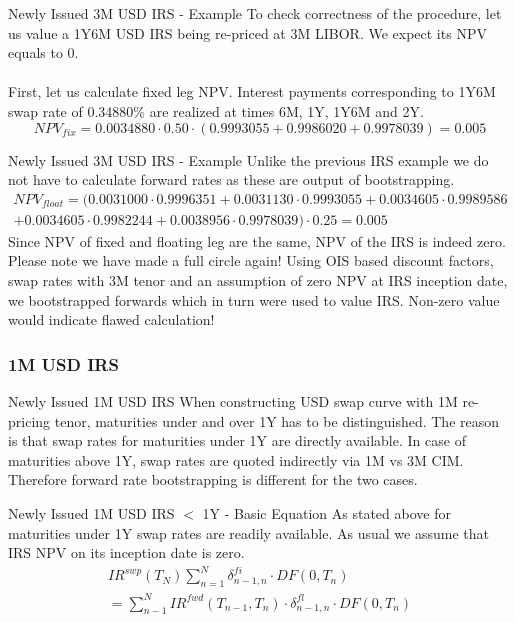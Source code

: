\documentclass{beamer}
\begin{document}
\begin{frame}{Newly Issued 3M USD IRS - Example}
To check correctness of the procedure, let us value a 1Y6M USD IRS being re-priced at 3M LIBOR. We expect its NPV equals to 0.
\\~\\
First, let us calculate fixed leg NPV. Interest payments corresponding to 1Y6M swap rate of 0.34880\% are realized at times 6M, 1Y, 1Y6M and 2Y.
\begin{equation*}
NPV_{fix} = 0.0034880 \cdot 0.50 \cdot (0.9993055 + 0.9986020 + 0.9978039) = 0.005
\end{equation*}
\end{frame}

\begin{frame}{Newly Issued 3M USD IRS - Example}
Unlike the previous IRS example we do not have to calculate forward rates as these are output of bootstrapping.
\begin{multline*}
NPV_{float} = (0.0031000 \cdot 0.9996351 + 0.0031130 \cdot 0.9993055 + 0.0034605 \cdot 0.9989586\\
+ 0.0034605 \cdot 0.9982244 + 0.0038956 \cdot 0.9978039) \cdot 0.25 = 0.005
\end{multline*}
Since NPV of fixed and floating leg are the same, NPV of the IRS is indeed zero. Please note we have made a full circle again! Using OIS based discount factors, swap rates with 3M tenor and an assumption of zero NPV at IRS inception date, we bootstrapped forwards which in turn were used to value IRS. Non-zero value would indicate flawed calculation!
\end{frame}

\subsubsection{1M USD IRS}

\begin{frame}{Newly Issued 1M USD IRS}
When constructing USD swap curve with 1M re-pricing tenor, maturities under and over 1Y has to be distinguished. The reason is that swap rates for maturities under 1Y are directly available. In case of maturities above 1Y, swap rates are quoted indirectly via 1M vs 3M CIM. Therefore forward rate bootstrapping is different for the two cases.
\end{frame}

\begin{frame}{Newly Issued 1M USD IRS $<$ 1Y - Basic Equation}
As stated above for maturities under 1Y swap rates are readily available. As usual we assume that IRS NPV on its inception date is zero.
\begin{multline*}
IR^{swp}(T_N) \sum_{n = 1}^N \delta_{n - 1, n}^{fi} \cdot DF(0, T_n)\\
= \sum_{n - 1}^N IR^{fwd}(T_{n - 1}, T_n) \cdot \delta_{n - 1, n}^{fl} \cdot DF(0, T_n)
\end{multline*}
\end{frame}
\end{document}
